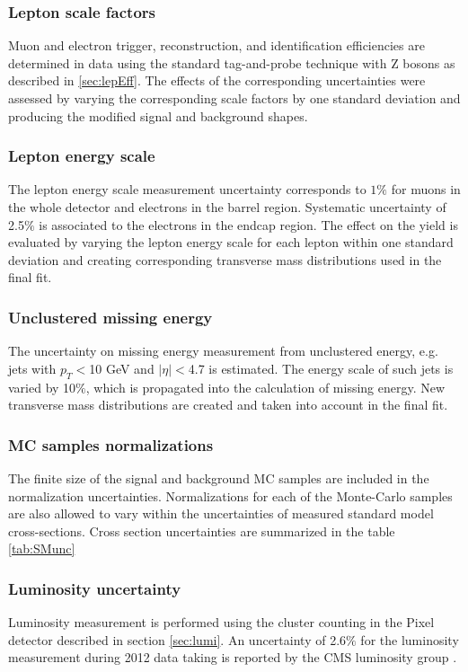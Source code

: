 \subsubsection*{Lepton scale factors}
        Muon and electron trigger, reconstruction, and identification efficiencies are determined in data using the standard tag-and-probe technique with Z bosons as described in \ref{sec:lepEff}. The effects of the corresponding uncertainties were assessed by varying the corresponding scale factors by one standard deviation and producing the modified signal and background shapes. 
\subsubsection*{Lepton energy scale} 
		The lepton energy scale measurement uncertainty corresponds to $1\%$ for muons in the whole detector and electrons in the barrel region. Systematic uncertainty of 2.5$\%$ is associated to the electrons in the endcap region. The effect on the yield is evaluated by varying the lepton energy scale for each lepton within one standard deviation and creating corresponding transverse mass distributions used in the final fit.
\subsubsection*{Unclustered missing energy}
        The uncertainty on missing energy measurement from unclustered energy, e.g. jets with $p_T<$10 GeV and $|\eta|<$4.7 is estimated. The energy scale of such jets is varied by 10$\%$, which is propagated into the calculation of missing energy. New transverse mass distributions are created and taken into account in the final fit.
\subsubsection*{MC samples normalizations}
        The finite size of the signal and background MC samples are included in the normalization uncertainties. Normalizations for each of the Monte-Carlo samples are also allowed to vary within the uncertainties of measured standard model cross-sections. Cross section uncertainties are summarized in the table \ref{tab:SMunc}
\subsubsection*{Luminosity uncertainty}
        Luminosity measurement is performed using the cluster counting in the Pixel detector described in section \ref{sec:lumi}. An uncertainty of 2.6$\%$ for the luminosity measurement during 2012 data taking is reported by the CMS luminosity group \cite{CMS-PAS-LUM-13-001}.

